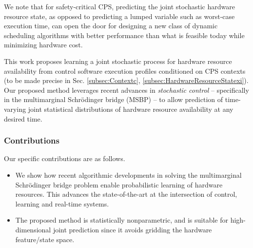 \documentclass[letterpaper, 10pt, twocolumn]{ieeeconf}      %
\newcommand{\red}{\textcolor{red}}
\begin{document}
We note that for safety-critical CPS, predicting the joint stochastic hardware resource state, as opposed to predicting a lumped variable such as worst-case execution time, can open the door for designing a new class of dynamic scheduling algorithms with better performance than what is feasible today while minimizing hardware cost.

This work proposes learning a joint stochastic process for hardware resource availability from control software execution profiles conditioned on CPS contexts (to be made precise in Sec. \ref{subsec:Contextc}, \ref{subsec:HardwareResourceStatexi}). Our proposed method leverages recent advances in \emph{stochastic control} -- specifically in the multimarginal Schr\"{o}dinger bridge (MSBP) -- to allow prediction of time-varying joint statistical distributions of hardware resource availability at any desired time.








\subsubsection*{Contributions} Our specific contributions are as follows.
\begin{itemize}

\item We show how recent algorithmic developments in solving the multimarginal Schr\"{o}dinger bridge problem enable probabilistic learning of hardware resources. This advances the state-of-the-art at the intersection of control, learning and real-time systems.

\item The proposed method is statistically nonparametric, and is suitable for high-dimensional joint prediction since it avoids gridding the hardware feature/state space.

\end{itemize}
\end{document}
